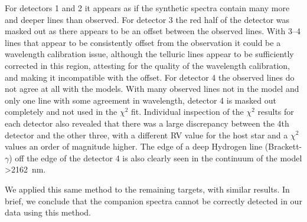 \documentclass[fleqn,usenatbib]{mnras}
\begin{document}
For detectors 1 and 2 it appears as if the synthetic spectra contain many more and deeper lines than observed. For detector 3 the red half of the detector was masked out as there appears to be an offset between the observed lines. With 3--4 lines that appear to be consistently offset from the observation it could be a wavelength calibration issue, although the telluric lines appear to be sufficiently corrected in this region, attesting for the quality of the wavelength calibration, and making it incompatible with the offset. For detector 4 the observed lines do not agree at all with the models. With many observed lines not in the model and only one line with some agreement in wavelength, detector 4 is masked out completely and not used in the \(\chi^2\) fit. Individual inspection of the \(\chi^2\) results for each detector also revealed that there was a large discrepancy between the 4th detector and the other three, with a different RV value for the host star and a \(\chi^2\) values an order of magnitude higher. The edge of a deep Hydrogen line (Brackett-\(\gamma\)) off the edge of the detector 4 is also clearly seen in the continuum of the model >2162~nm. 

We applied this same method to the remaining targets, with similar results. In brief, we conclude that the companion spectra cannot be correctly detected in our data using this method.
\end{document}
